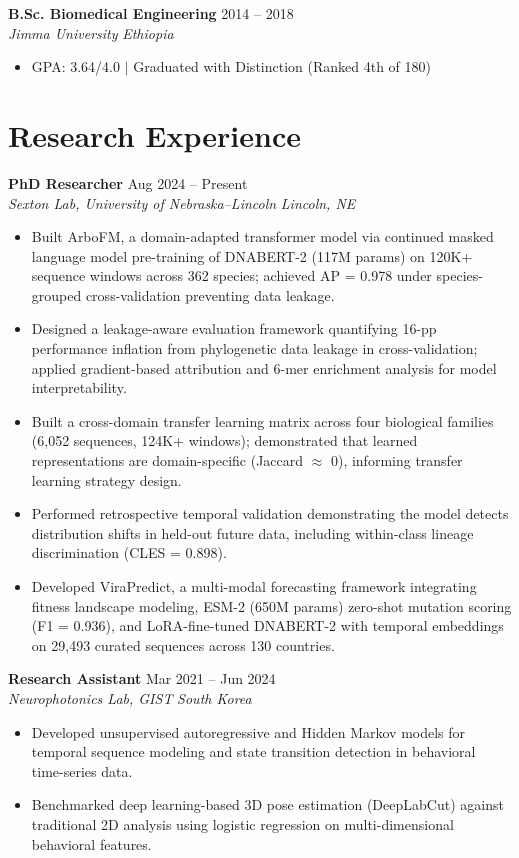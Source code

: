 \documentclass[10pt,a4paper]{article}
\newcommand{\entry}[4]{%
  \textbf{#1} \hfill #2 \\
  \textit{#3} \hfill \textit{#4} \\[1pt]
}
\begin{document}
\entry{B.Sc. Biomedical Engineering}{2014 -- 2018}
{Jimma University}{Ethiopia}
\begin{itemize}[leftmargin=1.2em, topsep=0pt, itemsep=1pt, parsep=0pt]
  \item GPA: 3.64/4.0 $|$ Graduated with Distinction (Ranked 4th of 180)
\end{itemize}

\section{Research Experience}

\entry{PhD Researcher}{Aug 2024 -- Present}
{Sexton Lab, University of Nebraska--Lincoln}{Lincoln, NE}
\begin{itemize}[leftmargin=1.2em, topsep=0pt, itemsep=1pt, parsep=0pt]
  \item Built ArboFM, a domain-adapted transformer model via continued masked language model pre-training of DNABERT-2 (117M params) on 120K+ sequence windows across 362 species; achieved AP = 0.978 under species-grouped cross-validation preventing data leakage.
  \item Designed a leakage-aware evaluation framework quantifying 16-pp performance inflation from phylogenetic data leakage in cross-validation; applied gradient-based attribution and 6-mer enrichment analysis for model interpretability.
  \item Built a cross-domain transfer learning matrix across four biological families (6,052 sequences, 124K+ windows); demonstrated that learned representations are domain-specific (Jaccard $\approx$ 0), informing transfer learning strategy design.
  \item Performed retrospective temporal validation demonstrating the model detects distribution shifts in held-out future data, including within-class lineage discrimination (CLES = 0.898).
  \item Developed ViraPredict, a multi-modal forecasting framework integrating fitness landscape modeling, ESM-2 (650M params) zero-shot mutation scoring (F1 = 0.936), and LoRA-fine-tuned DNABERT-2 with temporal embeddings on 29,493 curated sequences across 130 countries.
\end{itemize}
\vspace{1pt}

\entry{Research Assistant}{Mar 2021 -- Jun 2024}
{Neurophotonics Lab, GIST}{South Korea}
\begin{itemize}[leftmargin=1.2em, topsep=0pt, itemsep=1pt, parsep=0pt]
  \item Developed unsupervised autoregressive and Hidden Markov models for temporal sequence modeling and state transition detection in behavioral time-series data.
  \item Benchmarked deep learning-based 3D pose estimation (DeepLabCut) against traditional 2D analysis using logistic regression on multi-dimensional behavioral features.
\end{itemize}
\end{document}
